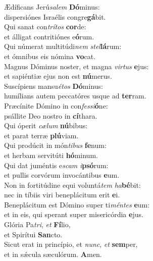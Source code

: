 \evenverse Ædíficans Jerú\textit{sa}\textit{lem} \textbf{Dó}minus:~\*\\
\evenverse dispersiónes Israélis congre\textbf{gá}bit.\\
\oddverse Qui sanat con\textit{trí}\textit{tos} \textbf{cor}de:~\*\\
\oddverse et álligat contritiónes e\textbf{ó}rum.\\
\evenverse Qui númerat multitúdi\textit{nem} \textit{stel}\textbf{lá}rum:~\*\\
\evenverse et ómnibus eis nómina \textbf{vo}cat.\\
\oddverse Magnus Dóminus noster, et magna \textit{vir}\textit{tus} \textbf{e}jus:~\*\\
\oddverse et sapiéntiæ ejus non est \textbf{nú}merus.\\
\evenverse Suscípiens mansu\textit{é}\textit{tos} \textbf{Dó}minus:~\*\\
\evenverse humílians autem peccatóres usque ad \textbf{ter}ram.\\
\oddverse Præcínite Dómino in con\textit{fes}\textit{si}\textbf{ó}ne:~\*\\
\oddverse psállite Deo nostro in \textbf{cí}thara.\\
\evenverse Qui óperit \textit{cæ}\textit{lum} \textbf{nú}bibus:~\*\\
\evenverse et parat terræ \textbf{plú}viam.\\
\oddverse Qui prodúcit in món\textit{ti}\textit{bus} \textbf{fe}num:~\*\\
\oddverse et herbam servitúti \textbf{hó}minum.\\
\evenverse Qui dat juméntis e\textit{scam} \textit{i}\textbf{psó}rum:~\*\\
\evenverse et pullis corvórum invocántibus \textbf{e}um.\\
\oddverse Non in fortitúdine equi voluntá\textit{tem} \textit{ha}\textbf{bé}bit:~\*\\
\oddverse nec in tíbiis viri beneplácitum erit \textbf{e}i.\\
\evenverse Beneplácitum est Dómino super ti\textit{mén}\textit{tes} \textbf{e}um:~\*\\
\evenverse et in eis, qui sperant super misericórdia \textbf{e}jus.\\
\oddverse Glória Pa\textit{tri}, \textit{et} \textbf{Fí}lio,~\*\\
\oddverse et Spirítui \textbf{San}cto.\\
\evenverse Sicut erat in princípio, et \textit{nunc}, \textit{et} \textbf{sem}per,~\*\\
\evenverse et in sǽcula sæculórum. \textbf{A}men.\\
